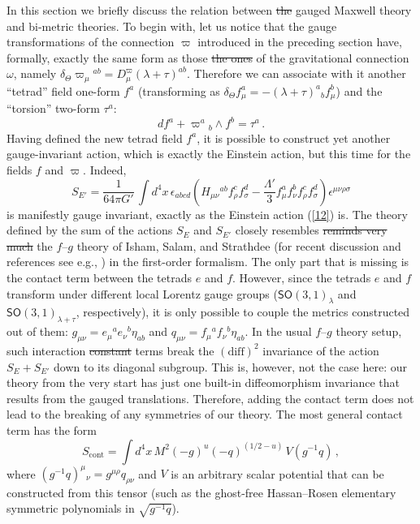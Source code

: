 \documentclass[11pt, a4paper]{article}
\newcommand{\lang}[1]{\textcolor{langfix}{#1}}
\newcommand{\subst}[1]{\textcolor{substantive}{#1}}
\newcommand{\rem}[1]{\textcolor{removeprop}{\sout{#1}}}
\def\SO{\mathsf{SO}}
\begin{document}
In this section we briefly discuss the relation between \rem{the} gauged Maxwell theory and bi-metric theories. To begin with, let us notice that the gauge transformations of the connection $\varpi$ introduced in the preceding section have, formally, exactly the same form as \lang{those} \rem{the ones} of the gravitational connection $\omega$\subst{, namely $\delta_\Theta \varpi_\mu{}^{ab} = D^\varpi_\mu (\lambda + \tau)^{ab}$}. Therefore we can associate with it another ``tetrad'' field one-form $f^a$ \subst{(transforming as $\delta_\Theta f^a_\mu = -(\lambda+\tau)^a{}_b f^b_\mu$)} and the ``torsion'' two-form $\tau^a$:
\begin{equation}\label{17}
df^a + \varpi^a{}_b\wedge f^b=\tau^a\,.
\end{equation}
Having defined the new tetrad field $f^a$, it is possible to construct yet another gauge-invariant action, which is exactly the Einstein action, but this time for the fields $f$ and $\varpi$. Indeed,
\begin{equation}
S_{E'} =\frac{1}{64\pi G'}\,
\int d^4x\,\epsilon_{abcd}\left(H_{\mu\nu}{}^{ab}f_{\rho}^{c}f_{\sigma}^{d}
-\frac{\Lambda'}{3}f_{\mu}^{a}f_{\nu}^{b}f_{\rho}^{ c}f_{\sigma}^{
d}\right)\epsilon^{\mu\nu\rho\sigma}\label{18}
\end{equation}
is manifestly gauge invariant, exactly as the Einstein action (\ref{12}) is. The theory defined by the sum of the actions $S_E$ and $S_{E'}$ \lang{closely resembles} \rem{reminds very much} the $f$--$g$ theory of Isham, Salam, and Strathdee \cite{Isham:1971gm} (for recent discussion and references see e.g., \cite{Banados:2008fi}) in the first-order formalism. The only part that is missing is the contact term between \lang{the} tetrads $e$ and $f$. However, since the tetrads $e$ and $f$ transform under different \lang{local Lorentz} gauge groups \subst{($\SO(3,1)_\lambda$ and $\SO(3,1)_{\lambda+\tau}$, respectively)}, it is only possible to couple the metrics constructed out of them: $g_{\mu\nu} = e_\mu{}^ae_\nu{}^b\eta_{ab}$ and $q_{\mu\nu} = f_\mu{}^af_\nu{}^b\eta_{ab}$. In the usual $f$--$g$ theory setup, such \lang{interaction} \rem{constant} terms break the $(\mathrm{diff})^2$ invariance of the action $S_E+S_{E'}$ down to its diagonal subgroup. This is, however, not the case here: our theory from the very start has just one built-in diffeomorphism invariance that results from the gauged translations. Therefore, adding the contact term does not lead to \lang{the} breaking of any symmetries of our theory. The most general contact term has the form
\begin{equation}\label{19}
S_{\mathrm{cont}} = \int d^4x\, M^2 (-g)^u (-q)^{(1/2-u)}\, V(g^{-1}q)\,,
\end{equation}
where $(g^{-1}q)^\mu{}_\nu = g^{\mu\rho}q_{\rho\nu}$ and $V$ is an arbitrary scalar potential that can be constructed from this tensor \subst{(such as the ghost-free Hassan--Rosen elementary symmetric polynomials in $\sqrt{g^{-1}q}$)}.
\end{document}
